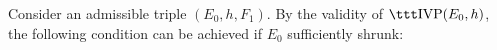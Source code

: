 %
%




	Consider an admissible triple $(E_0, h, F_1)$.
	By the validity of $\ivp(E_0,h)$, the following	
	condition can be achieved if $E_0$ sufficiently shrunk:

